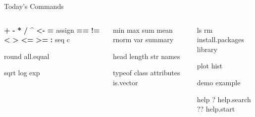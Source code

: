 \documentclass[
  11pt,
  ignorenonframetext,
]{beamer}
\newenvironment{Shaded}{\begin{snugshade}}{\end{snugshade}}
\newcommand{\ErrorTok}[1]{\textcolor[rgb]{0.64,0.00,0.00}{\textbf{#1}}}
\newcommand{\NormalTok}[1]{#1}
\newcommand{\SpecialCharTok}[1]{\textcolor[rgb]{0.81,0.36,0.00}{\textbf{#1}}}
\begin{document}
\begin{frame}[fragile]{Today's Commands}
\protect\hypertarget{todays-commands}{}
\begin{columns}[T,onlytextwidth]
\begin{column}{0.33\textwidth}
\begin{Shaded}
\begin{Highlighting}[]
\SpecialCharTok{+} \SpecialCharTok{{-}} \ErrorTok{*} \ErrorTok{/} \ErrorTok{\^{}}
\ErrorTok{\textless{}}\SpecialCharTok{{-}} \ErrorTok{=}\NormalTok{     assign}
\SpecialCharTok{==} \ErrorTok{!=} \ErrorTok{\textless{}} \ErrorTok{\textgreater{}} \ErrorTok{\textless{}=} \ErrorTok{\textgreater{}=}
\ErrorTok{:}     
\NormalTok{seq}
\NormalTok{c    }

\NormalTok{round }
\NormalTok{all.equal}

\NormalTok{sqrt }
\NormalTok{log }
\NormalTok{exp}

\end{Highlighting}
\end{Shaded}
\end{column}

\begin{column}{0.33\textwidth}
\begin{Shaded}
\begin{Highlighting}[]
\NormalTok{min       max }
\NormalTok{sum       mean }
\NormalTok{rnorm     var }
\NormalTok{summary}

\NormalTok{head}
\NormalTok{length}
\NormalTok{str}
\NormalTok{names}

\NormalTok{typeof}
\NormalTok{class}
\NormalTok{attributes}
\NormalTok{is.vector}
\end{Highlighting}
\end{Shaded}
\end{column}

\begin{column}{0.33\textwidth}
\begin{Shaded}
\begin{Highlighting}[]
\NormalTok{ls    rm}
\NormalTok{install.packages}
\NormalTok{library}

\NormalTok{plot }
\NormalTok{hist}

\NormalTok{demo}
\NormalTok{example}

\NormalTok{help         ? }
\NormalTok{help.search  ?? }
\NormalTok{help.start}

\end{Highlighting}
\end{Shaded}
\end{column}
\end{columns}
\end{frame}
\end{document}
